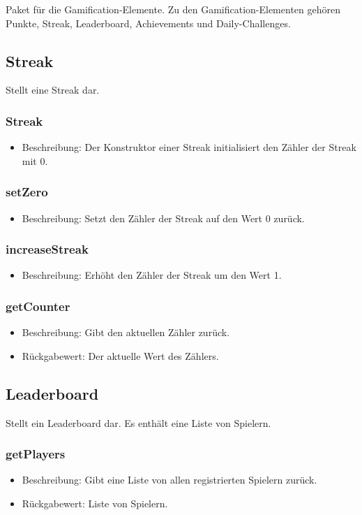 \documentclass[a4paper]{scrreprt}
\begin{document}
	Paket für die Gamification-Elemente. Zu den Gamification-Elementen gehören Punkte, Streak, Leaderboard, Achievements und Daily-Challenges.
	
	
	\subsection{Streak}
	Stellt eine Streak dar.
	
	\subsubsection{Streak}
	\begin{itemize}
		\item Beschreibung: Der Konstruktor einer Streak initialisiert den Zähler der Streak mit 0.
	\end{itemize}
	\subsubsection{setZero}
	\begin{itemize}
		\item Beschreibung: Setzt den Zähler der Streak auf den Wert 0 zurück.
	\end{itemize}
	\subsubsection{increaseStreak}
	\begin{itemize}
		\item Beschreibung: Erhöht den Zähler der Streak um den Wert 1.
	\end{itemize}
	\subsubsection{getCounter}
	\begin{itemize}
		\item Beschreibung: Gibt den aktuellen Zähler zurück.
		\item Rückgabewert: Der aktuelle Wert des Zählers.
	\end{itemize}
	
	
	\subsection{Leaderboard}
	Stellt ein Leaderboard dar. Es enthält eine Liste von Spielern.
	
	\subsubsection{getPlayers}
	\begin{itemize}
		\item Beschreibung: Gibt eine Liste von allen registrierten Spielern zurück.
		\item Rückgabewert: Liste von Spielern.
	\end{itemize}
\end{document}
